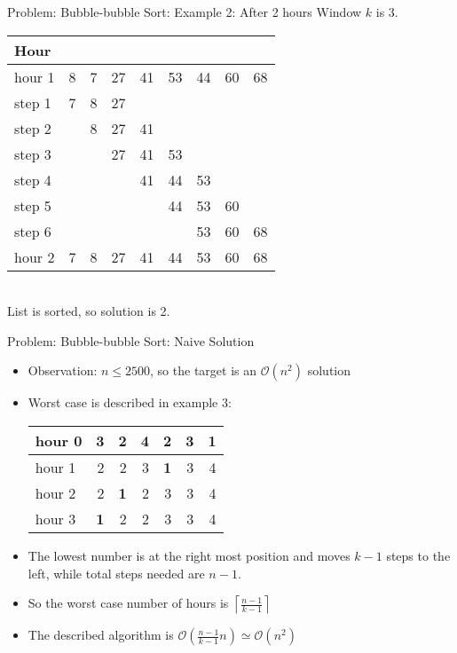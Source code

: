\documentclass[11pt,pdf, aspectratio=169]{beamer}
\begin{document}
  \begin{frame}{Problem: Bubble-bubble Sort: Example 2: After 2 hours}
    Window $k$ is 3.\\
    \begin{tabular}{|l|rrrrrrrr|}
      \hline
      Hour   &   &   &    &    &    &    &    &    \\
      \hline
      hour 1 & 8 & 7 & 27 & 41 & 53 & 44 & 60 & 68 \\
      \hline
      step 1 & 7 & 8 & 27 &    &    &    &    &    \\
      step 2 &   & 8 & 27 & 41 &    &    &    &    \\
      step 3 &   &   & 27 & 41 & 53 &    &    &    \\
      step 4 &   &   &    & 41 & 44 & 53 &    &    \\
      step 5 &   &   &    &    & 44 & 53 & 60 &    \\
      step 6 &   &   &    &    &    & 53 & 60 & 68 \\
      \hline
      hour 2 & 7 & 8 & 27 & 41 & 44 & 53 & 60 & 68 \\
      \hline
    \end{tabular}\\
    List is sorted, so solution is 2.
  \end{frame}
  \begin{frame}{Problem: Bubble-bubble Sort: Naive Solution}
    \begin{itemize}
      \item<1-> Observation: $n \leq 2500$, so the target is an $\mathcal{O}(n^2)$  solution
      \item<2-> Worst case is described in example 3:\\
      \begin{tabular}{|l|rrrrrr|}
        \hline
        hour 0 & 3          & 2          & 4 & 2          & 3 & \textbf{1} \\
        \hline
        hour 1 & 2          & 2          & 3 & \textbf{1} & 3 & 4          \\
        hour 2 & 2          & \textbf{1} & 2 & 3          & 3 & 4          \\
        \hline
        hour 3 & \textbf{1} & 2          & 2 & 3          & 3 & 4          \\
        \hline
      \end{tabular}
      \item<3-> The lowest number is at the right most position and moves $k-1$ steps to the left, while total steps needed are $n-1$.
      \item<3-> So the worst case number of hours is $\left\lceil\frac{n-1}{k-1}\right\rceil$
      \item<4-> The described algorithm is $\mathcal{O}\left(\frac{n-1}{k-1}n\right) \simeq \mathcal{O}(n^2)$
    \end{itemize}
  \end{frame}
\end{document}

